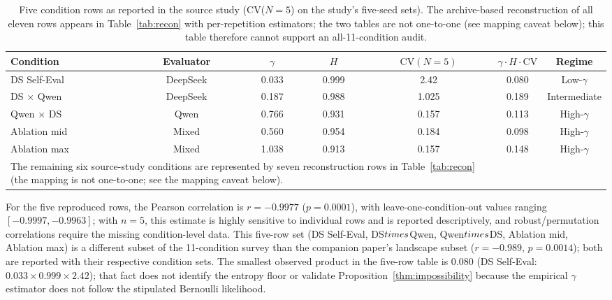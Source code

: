 \documentclass[11pt]{article}
\begin{document}
\begin{table}[t]
\centering
\caption{Five condition rows as reported in the source study (CV($N{=}5$) on the study's five-seed sets). The archive-based reconstruction of all eleven rows appears in Table~\ref{tab:recon} with per-repetition estimators; the two tables are not one-to-one (see mapping caveat below); this table therefore cannot support an all-11-condition audit.}
\label{tab:triangle_11}
\footnotesize
\begin{tabular}{@{}lcccccc@{}}
\toprule
Condition & Evaluator & $\gamma$ & $H$ & $\mathrm{CV}(N{=}5)$ & $\gamma \cdot H \cdot \mathrm{CV}$ & Regime \\
\midrule
DS Self-Eval & DeepSeek & 0.033 & 0.999 & 2.42 & 0.080 & Low-$\gamma$ \\
DS $\times$ Qwen & DeepSeek & 0.187 & 0.988 & 1.025 & 0.189 & Intermediate \\
Qwen $\times$ DS & Qwen & 0.766 & 0.931 & 0.157 & 0.113 & High-$\gamma$ \\
Ablation mid & Mixed & 0.560 & 0.954 & 0.184 & 0.098 & High-$\gamma$ \\
Ablation max & Mixed & 1.038 & 0.913 & 0.157 & 0.148 & High-$\gamma$ \\
\midrule
\multicolumn{5}{l}{\footnotesize The remaining six source-study conditions are represented by seven reconstruction rows in Table~\ref{tab:recon} (the mapping is not one-to-one; see the mapping caveat below).} \\
\bottomrule
\end{tabular}
\end{table}

For the five reproduced rows, the Pearson correlation is $r=-0.9977$ ($p = 0.0001$), with leave-one-condition-out values ranging $[-0.9997, -0.9963]$; with $n=5$, this estimate is highly sensitive to individual rows and is reported descriptively, and robust/permutation correlations require the missing condition-level data. This five-row set (DS Self-Eval, DS$\\times$Qwen, Qwen$\\times$DS, Ablation mid, Ablation max) is a different subset of the 11-condition survey than the companion paper's landscape subset ($r=-0.989$, $p=0.0014$); both are reported with their respective condition sets. The smallest observed product in the five-row table is $0.080$ (DS Self-Eval: $0.033 \times 0.999 \times 2.42$); that fact does not identify the entropy floor or validate Proposition~\ref{thm:impossibility} because the empirical $\gamma$ estimator does not follow the stipulated Bernoulli likelihood.
\end{document}
